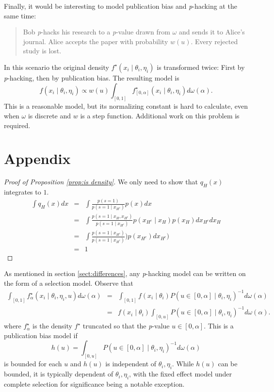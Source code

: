 \documentclass{article}
\theoremstyle{plain}
\theoremstyle{definition}
\begin{document}
Finally, it would be interesting to model publication bias and \textit{p}-hacking at the same time:
\begin{quote}
Bob \textit{p}-hacks his research to a \textit{p}-value drawn from $\omega$ and sends it to Alice's journal. Alice accepts the paper with probability $w(u)$. Every rejected study is lost.
\end{quote}
In this scenario the original density $f^{\star}(x_{i}\mid\theta_{i},\eta_{i})$ is transformed twice: First by \textit{p}-hacking, then by publication bias. The resulting model is $$f(x_{i}\mid\theta_{i},\eta_{i})\propto w(u)\int_{[0,1]}f_{[0,\alpha]}^{\star}(x_{i}\mid\theta_{i},\eta_{i})d\omega(\alpha).$$ This is a reasonable model, but its normalizing constant is hard to calculate, even when $\omega$ is discrete and $w$ is a step function. Additional work on this problem is required.

\section*{Appendix}
\begin{proof}[Proof of Proposition \ref{prop:is density}]
\label{proof:is density}
We only need to show that $q_{H}(x)$ integrates to $1$. \begin{eqnarray*}
\int q_{H}(x)dx & = & \int\frac{p(s=1)}{p(s=1\mid x_{H^{c}})}p(x)dx\\
 & = & \int\frac{p(s=1\mid x_{H},x_{H^{c}})}{p(s=1\mid x_{H^{c}})}p(x_{H^{c}}\mid x_{H})p(x_{H})dx_{H^{c}}dx_{H}\\
 & = & \int\frac{p(s=1\mid x_{H^{c}})}{p(s=1\mid x_{H^{c}})})p(x_{H^{c}})dx_{H^{c}})\\
 & = & 1
\end{eqnarray*}
\end{proof}
As mentioned in section \ref{sect:differences}, any \textit{p}-hacking model can be written on the form of a selection model. Observe that
\begin{eqnarray*}
\int_{[0,1]}f_\alpha^{\star}(x_{i}\mid\theta_{i},\eta_{i}, u)d\omega(\alpha) & = & \int_{[0,1]}f(x_{i}\mid\theta_{i})P(u\in\left[0,\alpha\right]\mid\theta_{i},\eta_{i})^{-1}d\omega(\alpha)\\
 & = & f(x_{i}\mid\theta_{i})\int_{[0,u]}P(u\in\left[0,\alpha\right]\mid\theta_{i},\eta_{i})^{-1}d\omega(\alpha).
\end{eqnarray*}
where $f_\alpha^{\star}$ is the density $f^{\star}$ truncated so that the \textit{p}-value $u\in\left[0,\alpha\right]$. This is a publication bias model if $$h(u)=\int_{[0,u]}P(u\in\left[0,\alpha\right]\mid\theta_{i},\eta_{i})^{-1}d\omega(\alpha)$$ is bounded for each $u$ and $h(u)$ is independent of $\theta_{i},\eta_{i}$. While $h(u)$ can be bounded, it is typically dependent of $\theta_{i},\eta_{i}$, with the fixed effect model under complete selection for significance being a notable exception.
\end{document}
